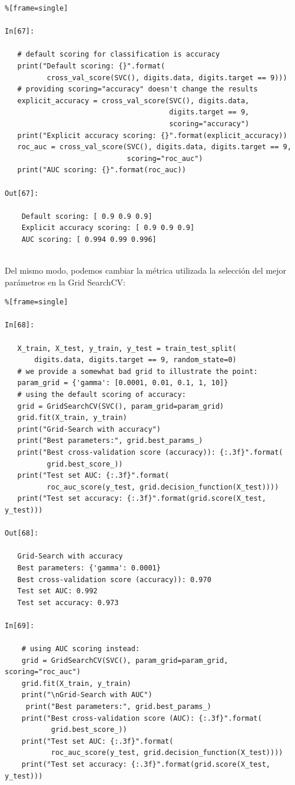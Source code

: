 { 
 
\begin{lstlisting}%[frame=single]
 
In[67]:
 
   # default scoring for classification is accuracy
   print("Default scoring: {}".format(
          cross_val_score(SVC(), digits.data, digits.target == 9)))
   # providing scoring="accuracy" doesn't change the results
   explicit_accuracy = cross_val_score(SVC(), digits.data, 
                                       digits.target == 9,
                                       scoring="accuracy")
   print("Explicit accuracy scoring: {}".format(explicit_accuracy))
   roc_auc = cross_val_score(SVC(), digits.data, digits.target == 9,
                             scoring="roc_auc")
   print("AUC scoring: {}".format(roc_auc))

Out[67]:
 
    Default scoring: [ 0.9 0.9 0.9]
    Explicit accuracy scoring: [ 0.9 0.9 0.9]
    AUC scoring: [ 0.994 0.99 0.996]
 
\end{lstlisting}
 
 
 Del mismo modo, podemos cambiar la métrica utilizada la selección del mejor parámetros en la {\ttfamily  Grid  SearchCV}:
 
 
 \begin{lstlisting}%[frame=single]
 
In[68]:

   X_train, X_test, y_train, y_test = train_test_split(
       digits.data, digits.target == 9, random_state=0)
   # we provide a somewhat bad grid to illustrate the point:
   param_grid = {'gamma': [0.0001, 0.01, 0.1, 1, 10]}
   # using the default scoring of accuracy:
   grid = GridSearchCV(SVC(), param_grid=param_grid)
   grid.fit(X_train, y_train)
   print("Grid-Search with accuracy")
   print("Best parameters:", grid.best_params_)
   print("Best cross-validation score (accuracy)): {:.3f}".format(
          grid.best_score_))
   print("Test set AUC: {:.3f}".format(
          roc_auc_score(y_test, grid.decision_function(X_test))))
   print("Test set accuracy: {:.3f}".format(grid.score(X_test, y_test)))
 
Out[68]:

   Grid-Search with accuracy
   Best parameters: {'gamma': 0.0001}
   Best cross-validation score (accuracy)): 0.970
   Test set AUC: 0.992
   Test set accuracy: 0.973
 
In[69]:

    # using AUC scoring instead:
    grid = GridSearchCV(SVC(), param_grid=param_grid, scoring="roc_auc")
    grid.fit(X_train, y_train)
    print("\nGrid-Search with AUC")
     print("Best parameters:", grid.best_params_)
    print("Best cross-validation score (AUC): {:.3f}".format(
           grid.best_score_))
    print("Test set AUC: {:.3f}".format(
           roc_auc_score(y_test, grid.decision_function(X_test))))
    print("Test set accuracy: {:.3f}".format(grid.score(X_test, y_test)))
 

\end{lstlisting}}

